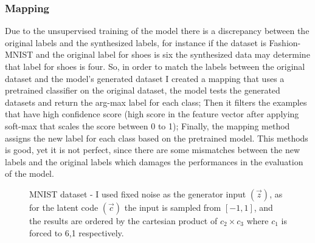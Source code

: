 \documentclass[letterpaper,12pt]{article}
\begin{document}
\subsubsection*{Mapping}
Due to the unsupervised training of the model there is a discrepancy between the original labels and the synthesized labels, for instance if the dataset is Fashion-MNIST and the original label for shoes is six the synthesized data may determine that label for shoes is four. So, in order to match the labels between the original dataset and the model's generated dataset I created a mapping that uses a pretrained classifier on the original dataset, the model tests  the generated datasets and return the arg-max label for each class; Then it filters the examples that have high confidence score (high score in the feature vector after applying soft-max that scales the score between 0 to 1); Finally, the mapping method assigns the new label for each class based on the pretrained model.  This methods is good, yet it is not perfect, since there are some mismatches between the new labels and the original labels which damages the performances in the evaluation of the model.
\begin{figure}[H]  
    \hspace{30px}
    \hspace{30px}
    \caption{MNIST dataset - I used fixed noise as the generator input $(\vec{z})$, as for the latent code $(\vec{c})$ the input is sampled from $[-1,1]$, and the results are ordered by the cartesian product of \( c_2 \times c_3\) where \(c_1\) is forced to 6,1 respectively.}
    \label{mnist}
\end{figure}
\end{document}
